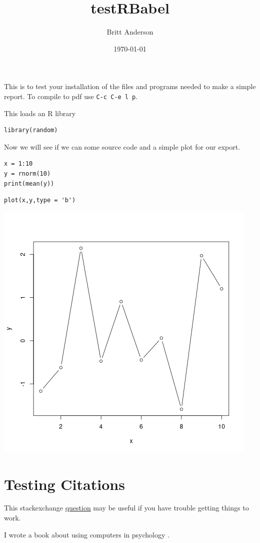 \documentclass{article}
\author{Britt Anderson}
\date{\today}
\title{testRBabel}
\begin{document}
\maketitle
\tableofcontents

This is to test your installation of the files and programs needed to make a simple report. To compile to pdf use \texttt{C-c C-e l p}.

This loads an R library
\begin{verbatim}
library(random)
\end{verbatim}


Now we will see if we can some source code and a simple plot for our export.

\begin{verbatim}
x = 1:10
y = rnorm(10)
print(mean(y))
\end{verbatim}

\begin{verbatim}
plot(x,y,type = 'b')
\end{verbatim}

\begin{center}
\includegraphics[width=.9\linewidth]{simplePlot.png}
\end{center}

\section{Testing Citations}
\label{sec:org8704726}

This stackexchange \href{https://tex.stackexchange.com/questions/114864/how-to-get-bibtex-to-work-with-org-mode-latex-export}{question} may be useful if you have trouble getting things to work. 

I wrote a book about using computers in psychology \cite{anderson2014computational}.




\end{document}
